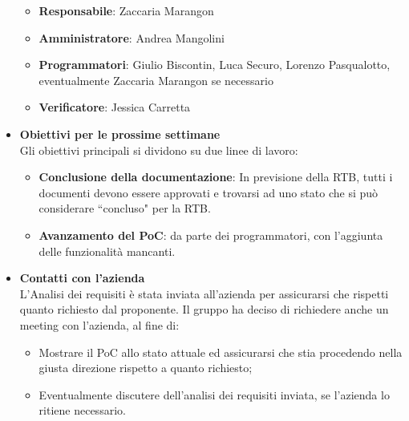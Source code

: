 \begin{itemize}
        \begin{itemize}
            \item \textbf{Responsabile}: Zaccaria Marangon
            \item \textbf{Amministratore}: Andrea Mangolini
            \item \textbf{Programmatori}: Giulio Biscontin, Luca Securo, Lorenzo Pasqualotto, eventualmente Zaccaria Marangon se necessario
            \item \textbf{Verificatore}: Jessica Carretta
        \end{itemize}
        \item \textbf{Obiettivi per le prossime settimane}\\
        Gli obiettivi principali si dividono su due linee di lavoro:
        \begin{itemize}
            \item \textbf{Conclusione della documentazione}: In previsione della RTB, tutti i documenti devono essere approvati e trovarsi ad uno stato che si può considerare ``concluso" per la RTB.
            \item \textbf{Avanzamento del PoC}: da parte dei programmatori, con l'aggiunta delle funzionalità mancanti.
        \end{itemize}
        \item \textbf{Contatti con l'azienda} \\
        L'Analisi dei requisiti è stata inviata all'azienda per assicurarsi che rispetti quanto richiesto dal proponente. Il gruppo ha deciso di richiedere anche un meeting con l'azienda, al fine di:
        \begin{itemize}
            \item Mostrare il PoC allo stato attuale ed assicurarsi che stia procedendo nella giusta direzione rispetto a quanto richiesto;
            \item Eventualmente discutere dell'analisi dei requisiti inviata, se l'azienda lo ritiene necessario.
        \end{itemize}
    \end{itemize}